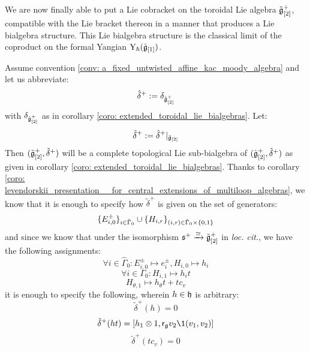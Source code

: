         We are now finally able to put a Lie cobracket on the toroidal Lie algebra $\tilde{\mathfrak{g}}_{[2]}^+$, compatible with the Lie bracket thereon in a manner that produces a Lie bialgebra structure. This Lie bialgebra structure is the classical limit of the coproduct on the formal Yangian $\mathrm{Y}_{\hbar}(\hat{\mathfrak{g}}_{[1]})$. 
        \begin{theorem} \label{theorem: toroidal_lie_bialgebras}
            Assume convention \ref{conv: a_fixed_untwisted_affine_kac_moody_algebra} and let us abbreviate:
                $$\hat{\delta}^+ := \delta_{\hat{\mathfrak{g}}_{[2]}^+}$$
            with $\delta_{\hat{\mathfrak{g}}_{[2]}^+}$ as in corollary \ref{coro: extended_toroidal_lie_bialgebras}. Let:
                $$\tilde{\delta}^+ := \hat{\delta}^+|_{\tilde{\mathfrak{g}}_{[2]}}$$
            Then $(\tilde{\mathfrak{g}}_{[2]}^+, \tilde{\delta}^+)$ will be a complete topological Lie sub-bialgebra of $(\hat{\mathfrak{g}}_{[2]}^+, \hat{\delta}^+)$ as given in corollary \ref{coro: extended_toroidal_lie_bialgebras}. Thanks to corollary \ref{coro: levendorskii_presentation__for_central_extensions_of_multiloop_algebras}, we know that it is enough to specify how $\tilde{\delta}^+$ is given on the set of generators:
                $$\{E_{i, 0}^{\pm}\}_{i \in \hat{\Gamma}_0} \cup \{H_{i, r}\}_{ (i, r) \in \hat{\Gamma}_0 \x \{0, 1\} }$$
            and since we know that under the isomorphism $\mathfrak{s}^+ \xrightarrow[]{\simeq} \tilde{\mathfrak{g}}_{[2]}^+$ in \textit{loc. cit.}, we have the following assignments:
                $$\forall i \in \hat{\Gamma}_0: E_{i, 0}^{\pm} \mapsto e_i^{\pm}, H_{i, 0} \mapsto h_i$$
                $$\forall i \in \Gamma_0: H_{i, 1} \mapsto h_i t$$
                $$H_{\theta, 1} \mapsto h_{\theta} t + t c_v$$
            it is enough to specify the following, wherein $h \in \mathfrak{h}$ is arbitrary:
                $$\tilde{\delta}^+(h) = 0$$
                $$\tilde{\delta}^+(ht) = [h_1 \tensor 1, \sfr_{\g} v_2 \1(v_1, v_2)]$$
                $$\tilde{\delta}^+(t c_v) = 0$$
        \end{theorem}

